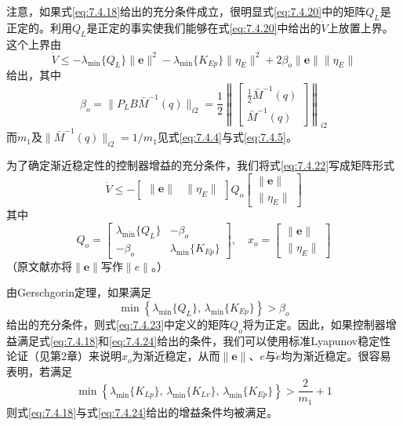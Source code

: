 \documentclass[UTF8]{ctexart}
\begin{document}
注意，如果式\eqref{eq:7.4.18}给出的充分条件成立，很明显式\eqref{eq:7.4.20}中的矩阵$Q_L$是正定的。利用$Q_L$是正定的事实使我们能够在式\eqref{eq:7.4.20}中给出的$\dot{V}$上放置上界。这个上界由
\begin{equation}\label{eq:7.4.22}
\dot{V} \leq -\lambda_{\min}\{Q_L\}\|\mathbf{e}\|^2 - \lambda_{\min}\{K_{Ep}\}\|\eta_E\|^2 + 2\beta_o \|\mathbf{e}\|\|\eta_E\|
\end{equation}
给出，其中
\begin{equation*}
\beta_o = \|P_L B \bar{M}^{-1}(q)\|_{i2} = \frac{1}{2}\left\|\begin{bmatrix} \frac{1}{2}\bar{M}^{-1}(q) \\ \bar{M}^{-1}(q) \end{bmatrix}\right\|_{i2}
\end{equation*}
而$m_1$及$\|\bar{M}^{-1}(q)\|_{i2}=1/m_1$见式\eqref{eq:7.4.4}与式\eqref{eq:7.4.5}。

为了确定渐近稳定性的控制器增益的充分条件，我们将式\eqref{eq:7.4.22}写成矩阵形式
\begin{equation}\label{eq:7.4.23}
\dot{V} \leq -\begin{bmatrix} \|\mathbf{e}\| & \|\eta_E\| \end{bmatrix} Q_o \begin{bmatrix} \|\mathbf{e}\| \\ \|\eta_E\| \end{bmatrix}
\end{equation}
其中
\begin{equation*}
Q_o = \begin{bmatrix} \lambda_{\min}\{Q_L\} & -\beta_o \\ -\beta_o & \lambda_{\min}\{K_{Ep}\} \end{bmatrix}, \quad
x_o = \begin{bmatrix} \|\mathbf{e}\| \\ \|\eta_E\| \end{bmatrix}
\end{equation*}
（原文献亦将$\|\mathbf{e}\|$写作$\|e\|$。）

由Gerschgorin定理，如果满足
\begin{equation}\label{eq:7.4.24}
\min\left\{ \lambda_{\min}\{Q_L\},\, \lambda_{\min}\{K_{Ep}\} \right\} > \beta_o
\end{equation}
给出的充分条件，则式\eqref{eq:7.4.23}中定义的矩阵$Q_o$将为正定。因此，如果控制器增益满足式\eqref{eq:7.4.18}和\eqref{eq:7.4.24}给出的条件，我们可以使用标准Lyapunov稳定性论证（见第2章）来说明$x_o$为渐近稳定，从而$\|\mathbf{e}\|$、$e$与$\dot{e}$均为渐近稳定。很容易表明，若满足
\begin{equation}\label{eq:7.4.25}
\min\left\{ \lambda_{\min}\{K_{Lp}\},\, \lambda_{\min}\{K_{Lv}\},\, \lambda_{\min}\{K_{Ep}\} \right\} > \frac{2}{m_1} + 1
\end{equation}
则式\eqref{eq:7.4.18}与式\eqref{eq:7.4.24}给出的增益条件均被满足。
\end{document}
